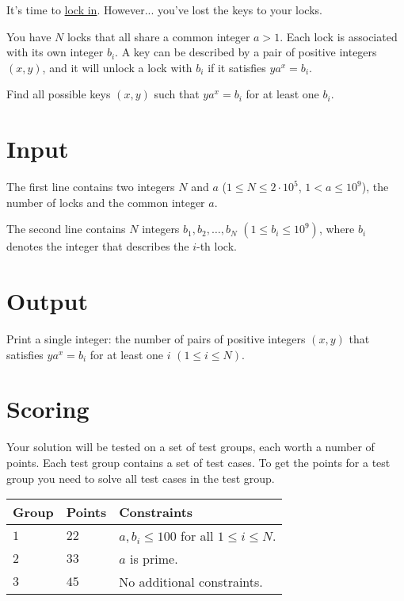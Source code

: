 
\noindent
It's time to \uline{lock in}. However... you've lost the keys to your locks.

You have $N$ locks that all share a common integer $a > 1$. Each lock is associated with its own integer $b_i$.
A key can be described by a pair of positive integers $(x,y)$, and it will unlock a lock with $b_i$ if it satisfies $ya^x = b_i$.

Find all possible keys $(x,y)$ such that $ya^x = b_i$ for at least one $b_i$.

\section*{Input}
The first line contains two integers $N$ and $a$ ($1 \leq N \leq 2 \cdot 10^5$, $1 < a \leq 10^9$), the number of locks and the common integer $a$.

The second line contains $N$ integers $b_1, b_2, \dots, b_N$ $(1 \leq b_i \leq 10^9)$, where $b_i$ denotes the integer that describes the $i$-th lock.

\section*{Output}
Print a single integer: the number of pairs of positive integers $(x,y)$ that satisfies $ya^x = b_i$ for at least one $i$ $(1\leq i \leq N)$.

\section*{Scoring}
Your solution will be tested on a set of test groups, each worth a number of points. Each test group contains
a set of test cases. To get the points for a test group you need to solve all test cases in the test group.

\noindent
\begin{tabular}{| l | l | p{12cm} |}
  \hline
  \textbf{Group} & \textbf{Points} & \textbf{Constraints} \\ \hline
  $1$    & $22$       & $a, b_i \leq 100$ for all $1 \leq i \leq N$. \\ \hline
  $2$    & $33$       & $a$ is prime. \\ \hline
  $3$    & $45$       & No additional constraints. \\ \hline
\end{tabular}

